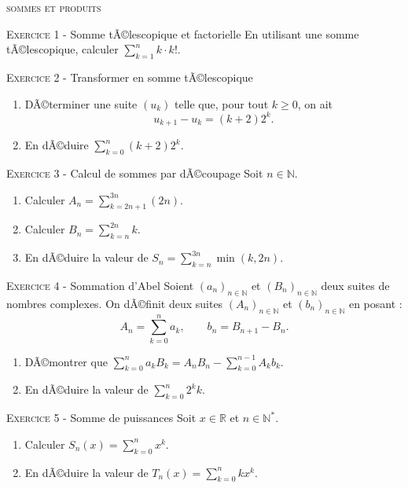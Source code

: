 \documentclass[11pt]{article}
\begin{document}
 

\begin{center}\textsc{{\huge sommes et produits}}\end{center}



\vskip0.3cm\noindent\textsc{Exercice 1} - Somme tÃ©lescopique et factorielle
\vskip0.2cm
En utilisant une somme tÃ©lescopique, calculer $\sum_{k=1}^n k\cdot k!$.




\vskip0.3cm\noindent\textsc{Exercice 2} - Transformer en somme tÃ©lescopique
\vskip0.2cm
\begin{enumerate}
\item DÃ©terminer une suite $(u_k)$ telle que, pour tout $k\geq 0$, on ait
$$u_{k+1}-u_k=(k+2) 2^k.$$
\item En dÃ©duire $\sum_{k=0}^{n}(k+2)2^k.$
\end{enumerate}




\vskip0.3cm\noindent\textsc{Exercice 3} - Calcul de sommes par dÃ©coupage
\vskip0.2cm
Soit $n\in\mathbb N$.
\begin{enumerate}
\item Calculer $A_n=\sum_{k=2n+1}^{3n}(2n)$.
\item Calculer $B_n=\sum_{k=n}^{2n}k$.
\item En dÃ©duire la valeur de $S_n=\sum_{k=n}^{3n}\min(k,2n)$.
\end{enumerate}




\vskip0.3cm\noindent\textsc{Exercice 4} - Sommation d'Abel 
\vskip0.2cm
Soient $(a_n)_{n\in\mathbb N}$ et $(B_n)_{n\in\mathbb N}$ deux suites de nombres complexes. On dÃ©finit deux suites $(A_n)_{n\in\mathbb N}$ et $(b_n)_{n\in\mathbb N}$ en posant :
$$A_n=\sum_{k=0}^n a_k,\quad\quad b_n=B_{n+1}-B_n.$$
\begin{enumerate}
\item DÃ©montrer que $\sum_{k=0}^n a_kB_k=A_n B_n-\sum_{k=0}^{n-1}A_kb_k.$
\item En dÃ©duire la valeur de $\sum_{k=0}^n 2^kk$.
\end{enumerate}




\vskip0.3cm\noindent\textsc{Exercice 5} - Somme de puissances
\vskip0.2cm
Soit $x\in\mathbb R$ et $n\in\mathbb N^*$.
\begin{enumerate}
\item Calculer $S_n(x)=\sum_{k=0}^n x^k.$
\item En dÃ©duire la valeur de $T_n(x)=\sum_{k=0}^n k x^k.$
\end{enumerate}
\end{document}
